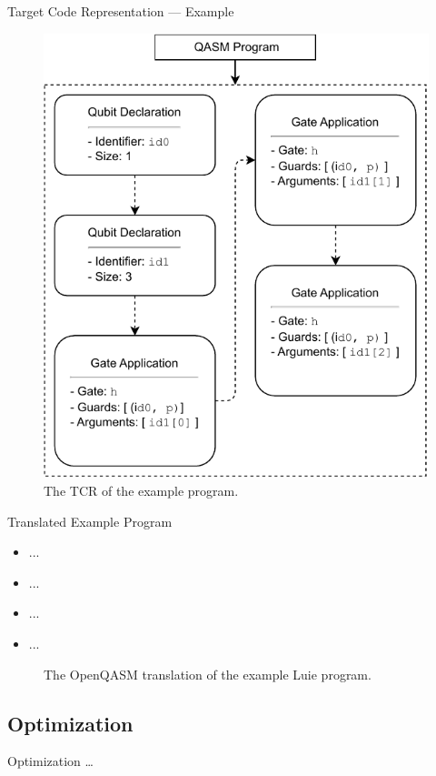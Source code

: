 \begin{frame}{Target Code Representation --- Example}
\begin{minipage}{.45\textwidth}
\begin{figure}[htp]
            \includegraphics[]{../figures/drawio/codeGen_targetCode_example.pdf}
            \caption{The TCR of the example program.}
        \end{figure}
    \end{minipage}
\end{frame}

\begin{frame}{Translated Example Program}    
    \begin{minipage}{.40\textwidth}
        \begin{itemize}
            \item ... 
            \item ... 
            \item ... 
            \item ... 
        \end{itemize}
    \end{minipage}
    \hfill
    \begin{minipage}{.55\textwidth}
        \centering
        \vfill
        \begin{figure}
            \centering
            
            \caption{The OpenQASM translation of the example Luie program.}
        \end{figure}
        \vfill
    \end{minipage}
\end{frame}

\subsection{Optimization}
\begin{frame}{Optimization}
    \dots
\end{frame}
